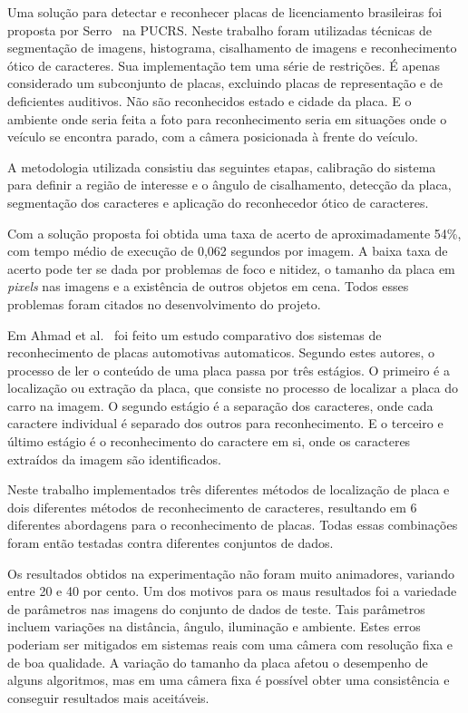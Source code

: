 Uma solução para detectar e reconhecer placas de licenciamento brasileiras foi
proposta por Serro~\cite{serro2012deteccao} na PUCRS\@. Neste trabalho foram
utilizadas técnicas de segmentação de imagens, histograma, cisalhamento de
imagens e reconhecimento ótico de caracteres. Sua implementação tem uma série de
restrições. É apenas considerado um subconjunto de placas, excluindo placas de
representação e de deficientes auditivos. Não são reconhecidos estado e cidade
da placa. E o ambiente onde seria feita a foto para reconhecimento seria em
situações onde o veículo se encontra parado, com a câmera posicionada à frente
do veículo.

A metodologia utilizada consistiu das seguintes etapas, calibração do sistema
para definir a região de interesse e o ângulo de cisalhamento, detecção da
placa, segmentação dos caracteres e aplicação do reconhecedor ótico de
caracteres.

Com a solução proposta foi obtida uma taxa de acerto de aproximadamente 54\%,
com tempo médio de execução de 0,062 segundos por imagem. A baixa taxa de acerto
pode ter se dada por problemas de foco e nitidez, o tamanho da placa em
\emph{pixels} nas imagens e a existência de outros objetos em cena. Todos esses
problemas foram citados no desenvolvimento do projeto.

Em Ahmad et al.~\cite{ahmad2015automatic} foi feito um estudo comparativo dos
sistemas de reconhecimento de placas automotivas automaticos. Segundo estes
autores, o processo de ler o conteúdo de uma placa passa por três estágios. O
primeiro é a localização ou extração da placa, que consiste no processo de
localizar a placa do carro na imagem. O segundo estágio é a separação dos
caracteres, onde cada caractere individual é separado dos outros para
reconhecimento. E o terceiro e último estágio é o reconhecimento do caractere em
si, onde os caracteres extraídos da imagem são identificados.

Neste trabalho implementados três diferentes métodos de localização de placa e
dois diferentes métodos de reconhecimento de caracteres, resultando em 6
diferentes abordagens para o reconhecimento de placas. Todas essas combinações
foram então testadas contra diferentes conjuntos de dados.

Os resultados obtidos na experimentação não foram muito animadores, variando
entre 20 e 40 por cento. Um dos motivos para os maus resultados foi a variedade
de parâmetros nas imagens do conjunto de dados de teste. Tais parâmetros incluem
variações na distância, ângulo, iluminação e ambiente. Estes erros poderiam ser
mitigados em sistemas reais com uma câmera com resolução fixa e de boa
qualidade. A variação do tamanho da placa afetou o desempenho de alguns
algoritmos, mas em uma câmera fixa é possível obter uma consistência e conseguir
resultados mais aceitáveis.

